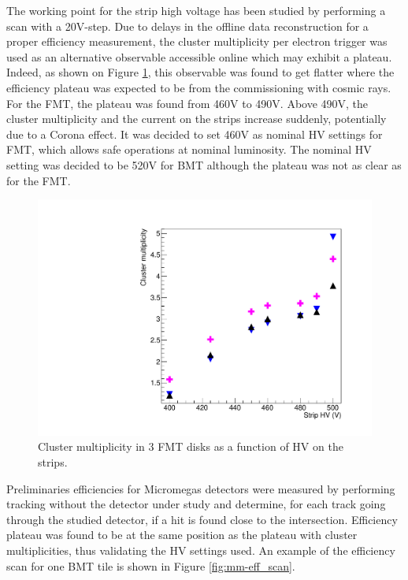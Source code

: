 The working point for the strip high voltage has been studied by performing a scan with a 20V-step. Due to delays in the offline data reconstruction for a proper efficiency measurement, the cluster multiplicity per electron trigger was used as an alternative observable accessible online which may exhibit a plateau. 
Indeed, as shown on Figure \ref{fig:mm-fig15}, this observable was found to get flatter where the efficiency plateau was expected to be from the commissioning with cosmic rays.  For the FMT, the plateau was found from 460V to 490V. Above 490V, the cluster multiplicity and the current on the strips increase suddenly, potentially due to a Corona effect. It was decided to set 460V as nominal HV settings for FMT, which allows safe operations at nominal luminosity. The nominal HV setting was decided to be 520V for BMT although the plateau was not as clear as for the FMT.  

\begin{figure}[htb]
 \includegraphics[width=1.0\columnwidth,keepaspectratio]{images/PseudoEfficiencies_ClusterMultiplicities_FMT_only3layers.pdf}
 \caption{Cluster multiplicity in 3 FMT disks as a function of HV on the strips.}
 \label{fig:mm-fig15}
\end{figure}

Preliminaries efficiencies for Micromegas detectors were measured by performing tracking without the detector under study and determine, for each track going through the studied detector, if a hit is found close to the intersection.
Efficiency plateau was found to be at the same position as the plateau with cluster multiplicities, thus validating the HV settings used.
 An example of the efficiency scan for one BMT tile is shown in Figure \ref{fig:mm-eff_scan}.

